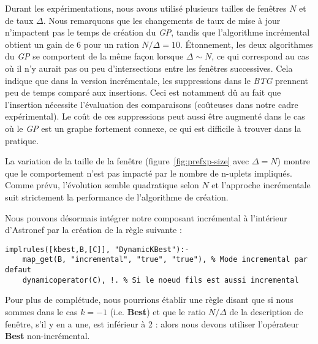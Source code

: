 Durant les expérimentations, nous avons utilisé plusieurs tailles de fenêtres $N$ et de taux $\Delta$. Nous remarquons que les changements de taux de mise à jour n'impactent pas le temps de création du \textit{GP}, tandis que l'algorithme incrémental obtient un gain de 6 pour un ration $N/\Delta=10$. Étonnement, les deux algorithmes du \textit{GP} se comportent de la même façon lorsque $\Delta\sim N$, ce qui correspond au cas où il n'y aurait pas ou peu d'intersections entre les fenêtres successives. Cela indique que dans la version incrémentale, les suppressions dans le \textit{BTG} prennent peu de temps comparé aux insertions. Ceci est notamment dû au fait que l'insertion nécessite l'évaluation des comparaisons (coûteuses dans notre cadre expérimental). Le coût de ces suppressions peut aussi être augmenté dans le cas où le \textit{GP} est un graphe fortement connexe, ce qui est difficile à trouver dans la pratique.

La variation de la taille de la fenêtre (figure~\ref{fig:prefxp-size} avec $\Delta=N$) montre que le comportement n'est pas impacté par le nombre de n-uplets impliqués. Comme prévu, l'évolution semble quadratique selon $N$ et l'approche incrémentale suit strictement la performance de l'algorithme de création.

Nous pouvons désormais intégrer notre composant incrémental à l'intérieur d'Astronef par la création de la règle suivante :
\begin{lstlisting}[language=PrologAstral]
implrules([kbest,B,[C]], "DynamicKBest"):- 
    map_get(B, "incremental", "true", "true"), % Mode incremental par defaut
    dynamicoperator(C), !. % Si le noeud fils est aussi incremental
\end{lstlisting}
Pour plus de complétude, nous pourrions établir une règle disant que si nous sommes dans le cas $k=-1$ (i.e. \textbf{Best}) et que le ratio $N/\Delta$ de la description de fenêtre, s'il y en a une, est inférieur à 2 : alors nous devons utiliser l'opérateur \textbf{Best} non-incrémental.
